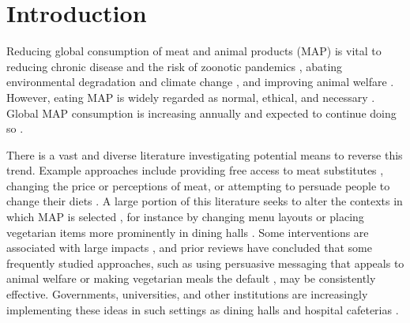 \documentclass[sn-nature,referee,pdflatex]{sn-jnl}
\begin{document}
\maketitle

\section{Introduction}\label{sec1}

Reducing global consumption of meat and animal products (MAP) is vital
to reducing chronic disease and the risk of zoonotic pandemics
\citep{willett2019, landry2023, hafez2020}, abating environmental
degradation and climate change
\citep{poore2018, koneswaran2008, greger2010}, and improving animal
welfare \citep{kuruc2023, scherer2019}. However, eating MAP is widely
regarded as normal, ethical, and necessary
\citep{piazza2022, milford2019}. Global MAP consumption is increasing
annually \citep{godfray2018} and expected to continue doing so
\citep{whitton2021}.

There is a vast and diverse literature investigating potential means to
reverse this trend. Example approaches include providing free access to
meat substitutes \citep{katare2023}, changing the price
\citep{horgen2002} or perceptions \citep{kunst2016} of meat, or
attempting to persuade people to change their diets
\citep{bianchi2018conscious}. A large portion of this literature seeks
to alter the contexts in which MAP is selected
\citep{bianchi2018restructuring}, for instance by changing menu layouts
\citep{bacon2018, gravert2021} or placing vegetarian items more
prominently in dining halls \citep{ginn2024}. Some interventions are
associated with large impacts
\citep{hansen2021, boronowsky2022, reinders2017}, and prior reviews have
concluded that some frequently studied approaches, such as using
persuasive messaging that appeals to animal welfare
\citep{mathur2021meta} or making vegetarian meals the default
\citep{meier2022}, may be consistently effective. Governments,
universities, and other institutions are increasingly implementing these
ideas in such settings as dining halls \citep{pollicino2024} and
hospital cafeterias \citep{morgenstern2024}.
\end{document}

